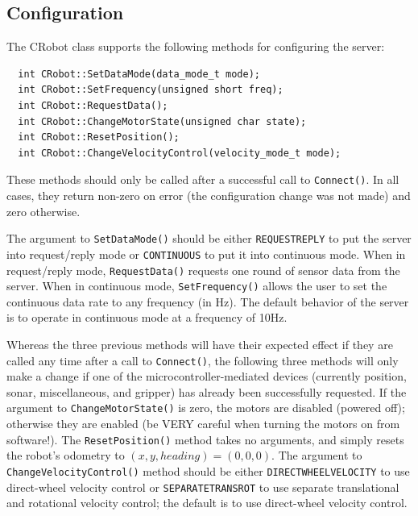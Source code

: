 \documentclass[11pt]{article}
\begin{document}
\subsection{Configuration}
The CRobot class supports the following methods for configuring the 
server:

\begin{verbatim}
  int CRobot::SetDataMode(data_mode_t mode);
  int CRobot::SetFrequency(unsigned short freq);
  int CRobot::RequestData();
  int CRobot::ChangeMotorState(unsigned char state);
  int CRobot::ResetPosition();
  int CRobot::ChangeVelocityControl(velocity_mode_t mode);
\end{verbatim}

These methods should only be called after a successful call to
{\tt Connect()}.  In all cases, they return non-zero on error
(the configuration change was not made) and zero otherwise.

The argument to {\tt SetDataMode()} should be either {\tt REQUESTREPLY}
to put the server into request/reply mode or {\tt CONTINUOUS} to 
put it into continuous mode. When in request/reply mode,
{\tt RequestData()} requests one round of sensor data from the server.
When in continuous mode, {\tt SetFrequency()} allows
the user to set the continuous data rate to any frequency (in Hz). 
The default behavior of the server is to operate in continuous mode
at a frequency of 10Hz. 

Whereas the three previous methods will have their expected effect
if they are called any time after a call to {\tt Connect()}, the
following three methods will only make a change if one of the
microcontroller-mediated devices (currently position, sonar, miscellaneous,
and gripper) has already been successfully requested.
If the argument to {\tt ChangeMotorState()} is zero, the motors
are disabled (powered off); otherwise they are enabled (be VERY careful
when turning the motors on from software!).  The {\tt ResetPosition()}
method takes no arguments, and simply resets the robot's 
odometry to $(x,y,heading) = (0,0,0)$.
 The argument to {\tt ChangeVelocityControl()}
method should be either {\tt DIRECTWHEELVELOCITY} to use direct-wheel
velocity control or {\tt SEPARATETRANSROT} to use separate
translational and rotational velocity control; the default is to
use direct-wheel velocity control.
\end{document}
